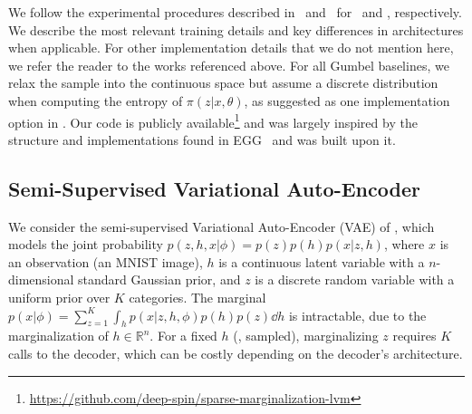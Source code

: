 We follow the experimental procedures described
in~\citep{RB19} and~\citep{Lazaridou2017} for~ and
, respectively. We describe the most relevant
training details and key differences in architectures when
applicable. For other implementation details that we do not mention
here, we refer the reader to the works referenced above. For all
Gumbel baselines, we relax the sample into the continuous space but
assume a discrete distribution when computing the entropy of $\pi(z
    |x, \theta)$, as suggested as one implementation option in
\citet{Concrete}. Our code is publicly available\footnote{
    \url{https://github.com/deep-spin/sparse-marginalization-lvm}} and was
largely inspired by the structure and implementations found in
EGG~\citep{Kharitonov2019} and was built upon it.

\subsection{Semi-Supervised Variational Auto-Encoder}\label{sec:gen}

\noindent We consider the semi-supervised Variational Auto-Encoder
(VAE) of \citet{KingmaEtAl2014SSVAE}, which models the joint
probability $p(z,h,x|\phi)=p(z)p(h)p(x|z,h)$, where $x$ is an
observation (an MNIST image), $h$ is a continuous latent variable
with a $n$-dimensional standard Gaussian prior, and $z$ is a discrete
random variable with a uniform prior over $K$ categories. The
marginal $p(x | \phi) = \sum_{z=1}^K \int_h p(x | z, h, \phi)p(h)p(z)
    \dd h$ is intractable, due to the marginalization of $h \in \mathbb
    R^n$. For a fixed $h$ (\eg, sampled), marginalizing $z$ requires $K$
calls to the decoder, which can be costly depending on the decoder's
architecture.

